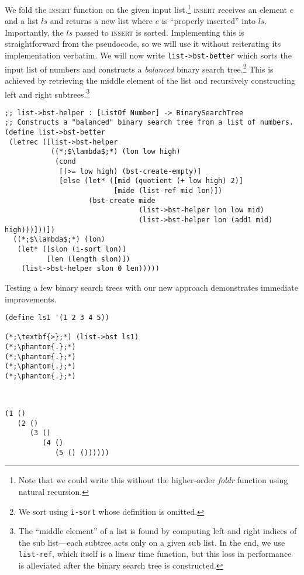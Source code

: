 We fold the \textsc{insert} function on the given input list.\footnote{Note that we could write this without the higher-order \textit{foldr} function using natural recursion.} \textsc{insert} receives an element $e$ and a list $ls$ and returns a new list where $e$ is ``properly inserted'' into $ls$. Importantly, the $ls$ passed to \textsc{insert} is sorted. Implementing this is straightforward from the pseudocode, so we will use it without reiterating its implementation verbatim. We will now write \texttt{list->bst-better} which sorts the input list of numbers and constructs a \textit{balanced} binary search tree.\footnote{We sort using \texttt{i-sort} whose definition is omitted.} This is achieved by retrieving the middle element of the list and recursively constructing left and right subtrees.\footnote{The ``middle element'' of a list is found by computing left and right indices of the sub list---each subtree acts only on a given sub list. In the end, we use \texttt{list-ref}, which itself is a linear time function, but this loss in performance is alleviated after the binary search tree is constructed.}

\begin{cl}[]{}\begin{lstlisting}[language=MyScheme]
;; list->bst-helper : [ListOf Number] -> BinarySearchTree
;; Constructs a "balanced" binary search tree from a list of numbers.
(define list->bst-better
 (letrec ([list->bst-helper
           ((*;$\lambda$;*) (lon low high)
            (cond
             [(>= low high) (bst-create-empty)]
             [else (let* ([mid (quotient (+ low high) 2)]
                          [mide (list-ref mid lon)])
                    (bst-create mide
                                (list->bst-helper lon low mid)
                                (list->bst-helper lon (add1 mid) high)))]))])
  ((*;$\lambda$;*) (lon)
   (let* ([slon (i-sort lon)]
          [len (length slon)])
    (list->bst-helper slon 0 len)))))
\end{lstlisting}\end{cl}

\noindent Testing a few binary search trees with our new approach demonstrates immediate improvements.

\begin{cloast}[]{}
\begin{lstlisting}[language=MyScheme]
(define ls1 '(1 2 3 4 5))

(*;\textbf{>};*) (list->bst ls1)
(*;\phantom{.};*)
(*;\phantom{.};*)
(*;\phantom{.};*)
(*;\phantom{.};*)
\end{lstlisting}
\tcblower\begin{lstlisting}[language=MyVOutput]


(1 () 
   (2 () 
      (3 () 
         (4 () 
            (5 () ())))))
\end{lstlisting}
\end{cloast}

